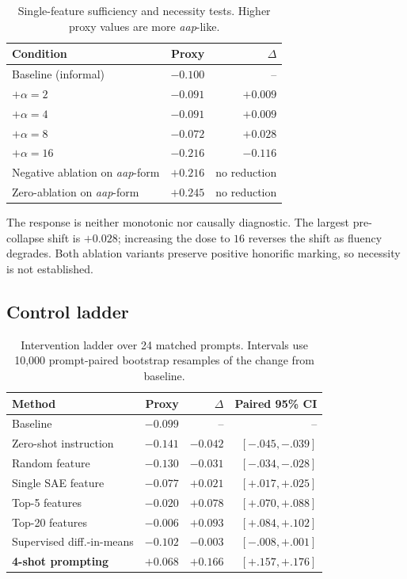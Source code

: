 \documentclass[10pt]{article}
\newcommand{\aap}{\textit{aap}}
\begin{document}
\begin{table}[H]
\centering
\small
\begin{tabular}{lrr}
\toprule
\textbf{Condition} & \textbf{Proxy} & \textbf{$\Delta$} \\
\midrule
Baseline (informal) & $-0.100$ & -- \\
$+\alpha=2$ & $-0.091$ & $+0.009$ \\
$+\alpha=4$ & $-0.091$ & $+0.009$ \\
$+\alpha=8$ & $-0.072$ & $+0.028$ \\
$+\alpha=16$ & $-0.216$ & $-0.116$ \\
\midrule
Negative ablation on \aap-form & $+0.216$ & no reduction \\
Zero-ablation on \aap-form & $+0.245$ & no reduction \\
\bottomrule
\end{tabular}
\caption{Single-feature sufficiency and necessity tests. Higher proxy values
are more \aap-like.}
\label{tab:dose}
\end{table}

The response is neither monotonic nor causally diagnostic. The largest
pre-collapse shift is $+0.028$; increasing the dose to $16$ reverses the shift
as fluency degrades. Both ablation variants preserve positive honorific marking,
so necessity is not established.

\subsection{Control ladder}

\begin{table}[H]
\centering
\scriptsize
\setlength\tabcolsep{2.5pt}
\begin{tabular}{lrrr}
\toprule
\textbf{Method} & \textbf{Proxy} & \textbf{$\Delta$} & \textbf{Paired 95\% CI} \\
\midrule
Baseline & $-0.099$ & -- & -- \\
Zero-shot instruction & $-0.141$ & $-0.042$ & $[-.045,-.039]$ \\
Random feature & $-0.130$ & $-0.031$ & $[-.034,-.028]$ \\
Single SAE feature & $-0.077$ & $+0.021$ & $[+.017,+.025]$ \\
Top-5 features & $-0.020$ & $+0.078$ & $[+.070,+.088]$ \\
Top-20 features & $-0.006$ & $+0.093$ & $[+.084,+.102]$ \\
Supervised diff.-in-means & $-0.102$ & $-0.003$ & $[-.008,+.001]$ \\
\textbf{4-shot prompting} & $\mathbf{+0.068}$ & $\mathbf{+0.166}$ & $\mathbf{[+.157,+.176]}$ \\
\bottomrule
\end{tabular}
\caption{Intervention ladder over 24 matched prompts. Intervals use 10,000
prompt-paired bootstrap resamples of the change from baseline.}
\label{tab:controls}
\end{table}
\end{document}
